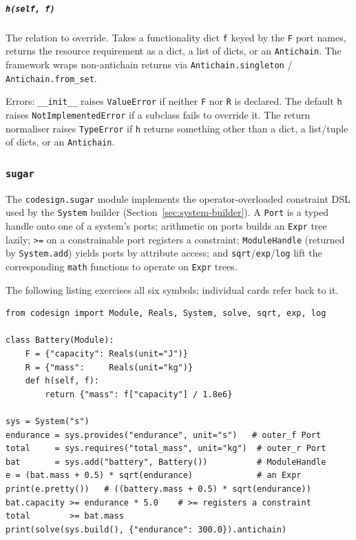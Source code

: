 \documentclass[11pt,a4paper]{article}
\begin{document}
\subparagraph{\texttt{h(self, f)}}\label{ref:module:module:h}
The relation to override. Takes a functionality dict \texttt{f} keyed by
the \texttt{F} port names, returns the resource requirement as a dict, a
list of dicts, or an \texttt{Antichain}. The framework wraps non-antichain
returns via \texttt{Antichain.singleton} / \texttt{Antichain.from\_set}.

Errors: \texttt{\_\_init\_\_} raises \texttt{ValueError} if neither
\texttt{F} nor \texttt{R} is declared. The default \texttt{h} raises
\texttt{NotImplementedError} if a subclass fails to override it. The return
normaliser raises \texttt{TypeError} if \texttt{h} returns something other
than a dict, a list/tuple of dicts, or an \texttt{Antichain}.

\subsubsection{\texttt{sugar}}
\label{ref:sugar}

The \texttt{codesign.sugar} module implements the operator-overloaded
constraint DSL used by the \texttt{System} builder
(Section~\ref{sec:system-builder}). A \texttt{Port} is a typed handle onto
one of a system's ports; arithmetic on ports builds an \texttt{Expr} tree
lazily; \texttt{>=} on a constrainable port registers a constraint;
\texttt{ModuleHandle} (returned by \texttt{System.add}) yields ports by
attribute access; and \texttt{sqrt}/\texttt{exp}/\texttt{log} lift the
corresponding \texttt{math} functions to operate on \texttt{Expr} trees.

The following listing exercises all six symbols; individual cards refer
back to it.

\begin{lstlisting}
from codesign import Module, Reals, System, solve, sqrt, exp, log

class Battery(Module):
    F = {"capacity": Reals(unit="J")}
    R = {"mass":     Reals(unit="kg")}
    def h(self, f):
        return {"mass": f["capacity"] / 1.8e6}

sys = System("s")
endurance = sys.provides("endurance", unit="s")   # outer_f Port
total     = sys.requires("total_mass", unit="kg")  # outer_r Port
bat       = sys.add("battery", Battery())          # ModuleHandle
e = (bat.mass + 0.5) * sqrt(endurance)             # an Expr
print(e.pretty())   # ((battery.mass + 0.5) * sqrt(endurance))
bat.capacity >= endurance * 5.0    # >= registers a constraint
total        >= bat.mass
print(solve(sys.build(), {"endurance": 300.0}).antichain)
\end{lstlisting}
\end{document}
